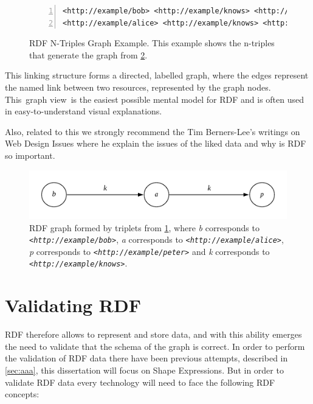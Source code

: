 \begin{figure}
\begin{lstlisting}[numbers=left, basicstyle=\ttfamily\scriptsize]
<http://example/bob> <http://example/knows> <http://example/alice> .
<http://example/alice> <http://example/knows> <http://example/peter> .
\end{lstlisting}
\caption[RDF N-Triples Graph Example]{RDF N-Triples Graph Example. This example shows the n-triples
that generate the graph from \cref{fig:rdf-graph}.}
\label{fig:rdf-ntriples-graph}
\end{figure}

This linking structure forms a directed, labelled graph, where the edges represent the named link
between two resources, represented by the graph nodes. This graph view is the easiest possible
mental model for RDF and is often used in easy-to-understand visual explanations.

Also, related to this we strongly recommend the Tim Berners-Lee’s writings on Web Design Issues
\cite{semantic-roadmap} where he explain the issues of the liked data and why is RDF so important.

\begin{figure}
\includegraphics[scale=0.2]{images/shex-lite-rdf-graph.png}
\centering
\caption[RDF Example graph]{RDF graph formed by triplets from \cref{fig:rdf-ntriples-graph}, where
\textit{b} corresponds to \textit{\texttt{<http://example/bob>}}, \textit{a} corresponds to
\textit{\texttt{<http://example/alice>}}, \textit{p} corresponds to \textit{\texttt{<http://example/peter>}}
and \textit{k} corresponds to \textit{\texttt{<http://example/knows>}}.}
\label{fig:rdf-graph}
\end{figure}


\section{Validating RDF}
RDF therefore allows to represent and store data, and with this ability emerges the need to validate
that the schema of the graph is correct. In order to perform the validation of RDF data there  have
been previous attempts, described in \cref{sec:aaa}, this dissertation will focus
on Shape Expressions. But in order to validate RDF data every technology will need to face the following
RDF concepts:

